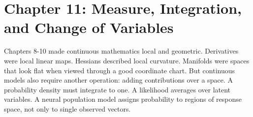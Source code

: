 \section{Chapter 11: Measure, Integration, and Change of Variables}
\label{ch:measure-integration-change-variables}

Chapters 8-10 made continuous mathematics local and geometric. Derivatives were local linear maps. Hessians described local curvature. Manifolds were spaces that look flat when viewed through a good coordinate chart. But continuous models also require another operation: adding contributions over a space. A probability density must integrate to one. A likelihood averages over latent variables. A neural population model assigns probability to regions of response space, not only to single observed vectors.

